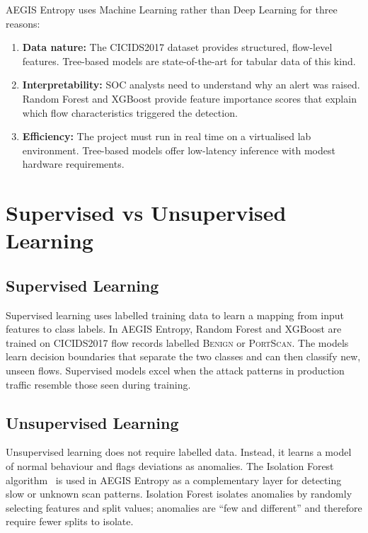 \documentclass[12pt,a4paper]{report}
\begin{document}
AEGIS Entropy uses Machine Learning rather than Deep Learning for three reasons:

\begin{enumerate}
    \item \textbf{Data nature:} The CICIDS2017 dataset provides structured, flow-level features. Tree-based models are state-of-the-art for tabular data of this kind.
    \item \textbf{Interpretability:} SOC analysts need to understand why an alert was raised. Random Forest and XGBoost provide feature importance scores that explain which flow characteristics triggered the detection.
    \item \textbf{Efficiency:} The project must run in real time on a virtualised lab environment. Tree-based models offer low-latency inference with modest hardware requirements.
\end{enumerate}

\section{Supervised vs Unsupervised Learning}\label{sec:supervised_unsupervised}

\subsection{Supervised Learning}

Supervised learning uses labelled training data to learn a mapping from input features to class labels. In AEGIS Entropy, Random Forest and XGBoost are trained on CICIDS2017 flow records labelled \textsc{Benign} or \textsc{PortScan}. The models learn decision boundaries that separate the two classes and can then classify new, unseen flows. Supervised models excel when the attack patterns in production traffic resemble those seen during training.

\subsection{Unsupervised Learning}

Unsupervised learning does not require labelled data. Instead, it learns a model of normal behaviour and flags deviations as anomalies. The Isolation Forest algorithm~\cite{liu2008} is used in AEGIS Entropy as a complementary layer for detecting slow or unknown scan patterns. Isolation Forest isolates anomalies by randomly selecting features and split values; anomalies are ``few and different'' and therefore require fewer splits to isolate.
\end{document}
